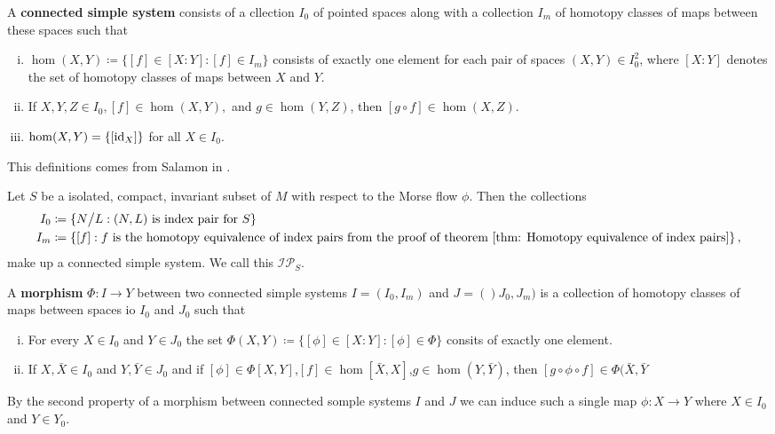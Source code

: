 \begin{definition}
	A \textbf{connected simple system} consists of a cllection $I_0$ of pointed spaces along with a collection $I_m$ of homotopy classes of maps between these spaces such that 
		\begin{enumerate}[(i)]
			\item $\hom(X,Y)\coloneq \{[f]\in [X:Y]:[f]\in I_m\}$ consists of exactly one element for each pair of spaces $(X,Y)\in I_0^2$, where $[X:Y]$ denotes the set of homotopy classes of maps between $X$ and $Y$.
			\item If $X,Y,Z\in I_0,[f]\in \hom(X,Y),$ and $g\in \hom(Y,Z)$, then $[g\circ f]\in \hom(X,Z)$.
			\item $\hom(X,Y)=\{[\operatorname{\mathrm{id}}_X]\}$ for all $X\in I_0$. 
		\end{enumerate}
\end{definition}
\begin{remark}
	This definitions comes from Salamon in \cite{Salamon1985}.
\end{remark}

\begin{remark} Let $S$ be a isolated, compact, invariant subset of $M$ with respect to the Morse flow $\phi$. Then the collections
\begin{align*}
	I_0&\coloneq \{N\big/ L: (N,L)\text{ is index pair for }S\}\\
	I_m&\coloneq \{[f]: f \text{ is the homotopy equivalence of index pairs from the proof of theorem \ref{thm: Homotopy equivalence of index pairs}}\}\,,
\end{align*} make up a connected simple system. We call this $\mathcal{IP}_S$.
\end{remark}

\begin{definition}
A \textbf{morphism} $\Phi:I\to Y$ between two connected simple systems $I=(I_0,I_m)$ and $J=()J_0,J_m)$ is a collection of homotopy classes of maps between spaces io $I_0$ and $J_0$ such that
\begin{enumerate}[(i)]
	\item For every $X\in I_0$ and $Y\in J_0$ the set $\Phi(X,Y)\coloneq \{[\phi]\in [X:Y]:[\phi]\in \Phi\}$ consits of exactly one element. 
	\item If $X,\bar{X}\in I_0$ and $Y,\bar{Y}\in J_0$ and if $[\phi]\in \Phi[X,Y]$,$[f]\in \hom[\bar{X},X]$,$g\in \hom(Y,\bar{Y})$, then $[g\circ \phi\circ f]\in \Phi(\bar{X},\bar{Y}$
\end{enumerate}
\end{definition}
\begin{remark}
	By the second property of a morphism between connected somple systems $I$ and $J$ we can induce such a single map $\phi:X\to Y$ where $X\in I_0$ and $Y\in Y_0$. 
\end{remark}

